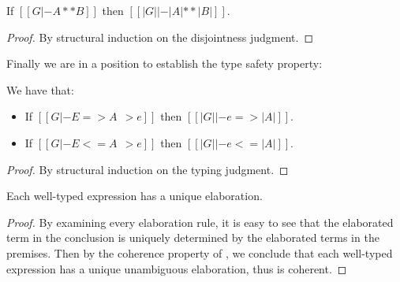 \begin{lemma}
  If $[[G |- A ** B]]$ then $[[ |G| |- |A| ** |B| ]]$.
\end{lemma}
\begin{proof}
  By structural induction on the disjointness judgment.
\end{proof}


Finally we are in a position to establish the type safety property:
\begin{theorem}
  We have that:
  \begin{itemize}
  \item If $[[G  |- E => A ~~> e]]$ then $ [[ |G|  |- e => |A| ]] $.
  \item If $[[G  |- E <= A ~~> e]]$ then $ [[ |G|  |- e <= |A| ]] $.
  \end{itemize}
\end{theorem}
\begin{proof}
    By structural induction on the typing judgment.
\end{proof}

\begin{theorem}[Coherence] Each well-typed \name expression has a unique elaboration.
\end{theorem}
\begin{proof}
  By examining every elaboration rule, it is easy to see that the elaborated
  \bname term in the conclusion is uniquely determined by the elaborated \bname
  terms in the premises. Then by the coherence property of \bname, we conclude
  that each well-typed \name expression has a unique unambiguous elaboration,
  thus \name is coherent.
\end{proof}




